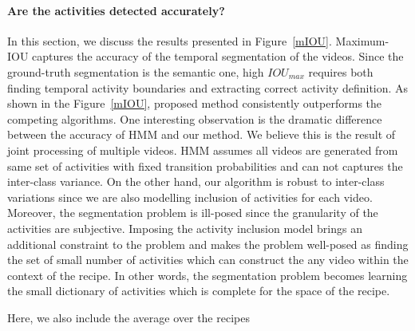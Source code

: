 \paragraph{Are the activities detected accurately?}
In this section, we discuss the results presented in Figure~\ref{mIOU}. Maximum-IOU captures the accuracy of the temporal segmentation of the videos. Since the ground-truth segmentation is the semantic one, high $IOU_{max}$ requires both finding temporal activity boundaries and extracting correct activity definition. As shown in the Figure~\ref{mIOU}, proposed method consistently outperforms the competing algorithms. One interesting observation is the dramatic difference between the accuracy of HMM and our method. We believe this is the result of joint processing of multiple videos. HMM assumes all videos are generated from same set of activities with fixed transition probabilities and can not captures the inter-class variance. On the other hand, our algorithm is robust to inter-class variations since we are also modelling inclusion of activities for each video. Moreover, the segmentation problem is ill-posed since the granularity of the activities are subjective. Imposing the activity inclusion model brings an additional constraint to the problem and makes the problem well-posed as finding the set of small number of activities which can construct the any video within the context of the recipe. In other words, the segmentation problem becomes learning the small dictionary of activities which is complete for the space of the recipe.


Here, we also include the average over the recipes
\begin{table}
\caption{Average of $IOU_{max}$ and $mAP_{max}$ over recipes.}
{\small
{}}
\normalsize
\end{table}

